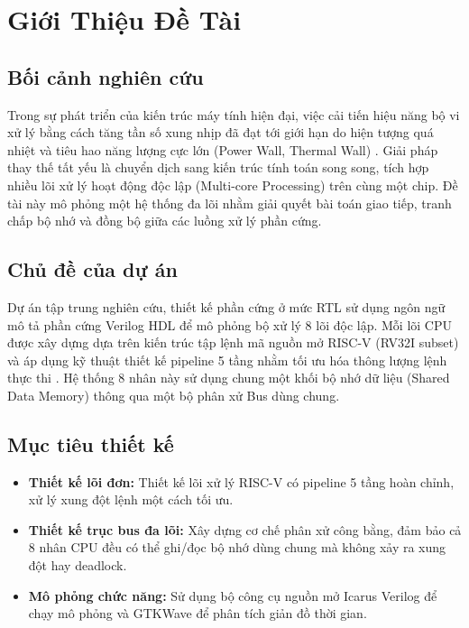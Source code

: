 \chapter{Giới Thiệu Đề Tài}

\section{Bối cảnh nghiên cứu}
Trong sự phát triển của kiến trúc máy tính hiện đại, việc cải tiến hiệu năng bộ vi xử lý bằng cách tăng tần số xung nhịp đã đạt tới giới hạn do hiện tượng quá nhiệt và tiêu hao năng lượng cực lớn (Power Wall, Thermal Wall) \cite{patterson}. Giải pháp thay thế tất yếu là chuyển dịch sang kiến trúc tính toán song song, tích hợp nhiều lõi xử lý hoạt động độc lập (Multi-core Processing) trên cùng một chip. Đề tài này mô phỏng một hệ thống đa lõi nhằm giải quyết bài toán giao tiếp, tranh chấp bộ nhớ và đồng bộ giữa các luồng xử lý phần cứng.

\section{Chủ đề của dự án}
Dự án tập trung nghiên cứu, thiết kế phần cứng ở mức RTL sử dụng ngôn ngữ mô tả phần cứng Verilog HDL để mô phỏng bộ xử lý 8 lõi độc lập. Mỗi lõi CPU được xây dựng dựa trên kiến trúc tập lệnh mã nguồn mở RISC-V (RV32I subset) \cite{riscv_unprivileged} và áp dụng kỹ thuật thiết kế pipeline 5 tầng nhằm tối ưu hóa thông lượng lệnh thực thi \cite{patterson}. Hệ thống 8 nhân này sử dụng chung một khối bộ nhớ dữ liệu (Shared Data Memory) thông qua một bộ phân xử Bus dùng chung.

\section{Mục tiêu thiết kế}
\begin{itemize}
    \item \textbf{Thiết kế lõi đơn:} Thiết kế lõi xử lý RISC-V có pipeline 5 tầng hoàn chỉnh, xử lý xung đột lệnh một cách tối ưu.
    \item \textbf{Thiết kế trục bus đa lõi:} Xây dựng cơ chế phân xử công bằng, đảm bảo cả 8 nhân CPU đều có thể ghi/đọc bộ nhớ dùng chung mà không xảy ra xung đột hay deadlock.
    \item \textbf{Mô phỏng chức năng:} Sử dụng bộ công cụ nguồn mở Icarus Verilog để chạy mô phỏng và GTKWave để phân tích giản đồ thời gian.
\end{itemize}

